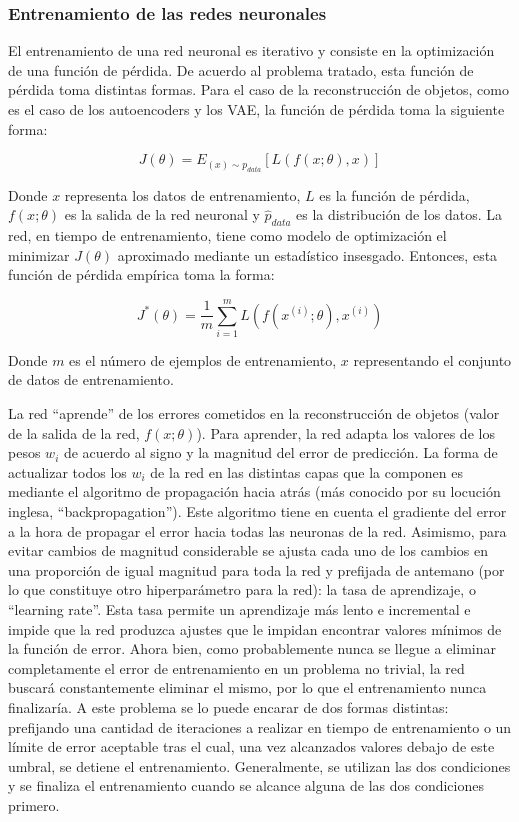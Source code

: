 \documentclass[12pt, spanish]{article}
\begin{document}
\subsubsection{Entrenamiento de las redes neuronales}
El entrenamiento de una red neuronal es iterativo y consiste en la optimización
de una función de pérdida. De acuerdo al problema tratado, esta función de
pérdida toma distintas formas. Para el caso de la reconstrucción de objetos,
como es el caso de los autoencoders y los VAE, la función de pérdida toma la
siguiente forma:


\[
J(\theta)=E_{(x)\sim p_{data}}[L(f(x;\theta),x)]
\]

Donde $x$ representa los datos de entrenamiento, $L$ es la función
de pérdida, $f(x;\theta)$ es la salida de la red neuronal y $\hat{p}_{data}$
es la distribución de los datos. La red, en tiempo de entrenamiento,
tiene como modelo de optimización el minimizar $J(\theta)$ aproximado
mediante un estadístico insesgado. Entonces, esta función de pérdida
empírica toma la forma:

\[
J^{*}(\theta)=\frac{1}{m}\sum_{i=1}^{m}L(f(x^{(i)};\theta),x^{(i)})
\]

Donde $m$ es el número de ejemplos de entrenamiento, $x$ representando
el conjunto de datos de entrenamiento.

La red ``aprende'' de los errores cometidos en la reconstrucción de objetos
(valor de la salida de la red, $f(x;\theta)$). Para aprender, la red adapta
los valores de los pesos $w_i$ de acuerdo al signo y la magnitud del error
de predicción.  La forma de actualizar todos los $w_i$ de la red en las
distintas capas que la componen es mediante el algoritmo de propagación hacia
atrás (más conocido por su locución inglesa, ``backpropagation''). Este
algoritmo tiene en cuenta el gradiente del error a la hora de propagar el error
hacia todas las neuronas de la red. Asimismo, para evitar cambios de magnitud
considerable se ajusta cada uno de los cambios en una proporción de igual
magnitud para toda la red y prefijada de antemano (por lo que constituye otro
hiperparámetro para la red): la tasa de aprendizaje, o ``learning rate''. Esta
tasa permite un aprendizaje más lento e incremental e impide que la red produzca
ajustes que le impidan encontrar valores mínimos de la función de error. Ahora
bien, como probablemente nunca se llegue a eliminar completamente el error de
entrenamiento en un problema no trivial, la red buscará constantemente eliminar
el mismo, por lo que el entrenamiento nunca finalizaría. A este problema se lo
puede encarar de dos formas distintas: prefijando una cantidad de iteraciones a
realizar en tiempo de entrenamiento o un límite de error aceptable tras el cual,
una vez alcanzados valores debajo de este umbral, se detiene el entrenamiento.
Generalmente, se utilizan las dos condiciones y se finaliza el entrenamiento
cuando se alcance alguna de las dos condiciones primero.
\end{document}
